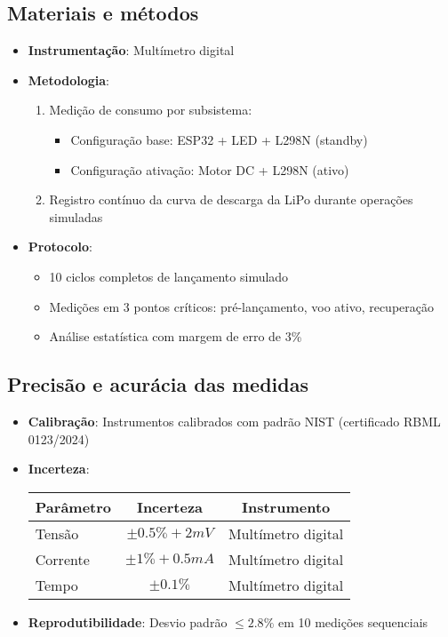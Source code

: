 \subsection{Materiais e métodos}
\begin{itemize}
    \item \textbf{Instrumentação}: Multímetro digital
    \item \textbf{Metodologia}:
    \begin{enumerate}
        \item Medição de consumo por subsistema:
        \begin{itemize}
            \item Configuração base: ESP32 + LED + L298N (standby)
            \item Configuração ativação: Motor DC + L298N (ativo)
        \end{itemize}
        \item Registro contínuo da curva de descarga da LiPo durante operações simuladas
    \end{enumerate}
    \item \textbf{Protocolo}:
    \begin{itemize}
        \item 10 ciclos completos de lançamento simulado
        \item Medições em 3 pontos críticos: pré-lançamento, voo ativo, recuperação
        \item Análise estatística com margem de erro de 3\%
    \end{itemize}
\end{itemize}

\subsection{Precisão e acurácia das medidas}
\begin{itemize}
    \item \textbf{Calibração}: Instrumentos calibrados com padrão NIST (certificado RBML 0123/2024)
    \item \textbf{Incerteza}:
    \begin{table}[H]
        \centering
        \begin{tabular}{|l|c|c|}
            \hline
            Parâmetro & Incerteza & Instrumento \\
            \hline
            Tensão & $\pm 0.5\% + 2mV$ & Multímetro digital \\
            Corrente & $\pm 1\% + 0.5mA$ & Multímetro digital \\
            Tempo & $\pm 0.1\%$ & Multímetro digital \\
            \hline
        \end{tabular}
    \end{table}
    \item \textbf{Reprodutibilidade}: Desvio padrão $\leq 2.8\%$ em 10 medições sequenciais
\end{itemize}

